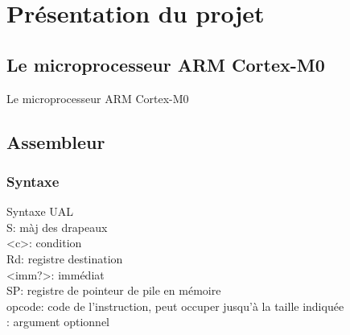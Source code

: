 \section{Présentation du projet}
\subsection{Le microprocesseur ARM Cortex-M0}
	Le microprocesseur ARM Cortex-M0 

\subsection{Assembleur}

\subsubsection{Syntaxe}
Syntaxe UAL\\
S: màj des drapeaux\\
<c>: condition\\
Rd: registre destination\\
<imm?>: immédiat\\
SP: registre de pointeur de pile en mémoire\\
opcode: code de l'instruction, peut occuper jusqu'à la taille indiquée\\
\[\]: argument optionnel\\

